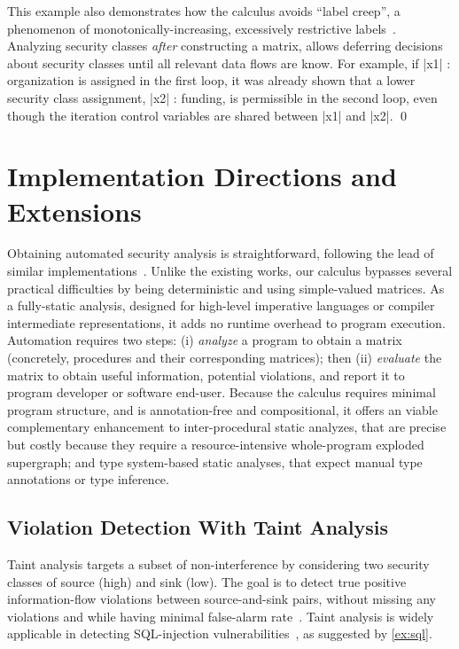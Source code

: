 \documentclass[conference]{IEEEtran}
\begin{document}
\begin{example}
This example also demonstrates how the calculus avoids \enquote{label creep}, a phenomenon of monotonically-increasing, excessively restrictive labels~\cite{sabelfeld2003}.
Analyzing security classes \emph{after} constructing a matrix, allows deferring decisions about security classes until all relevant data flows are know.
For example, if \prc|x1| : organization is assigned in the first loop, it was already shown that a lower security class assignment, \prc|x2| : funding, is permissible in the second loop, even though the iteration control variables are shared between \prc|x1| and \prc|x2|.
\qed
\end{example}


\section{Implementation Directions and Extensions}
\label{sec:implementation}

Obtaining automated security analysis is straightforward, following the lead of similar implementations~\cite{Aubert2022l,Moyen2017}.
Unlike the existing works, our calculus bypasses several practical difficulties by being deterministic and using simple-valued matrices.
As a fully-static analysis, designed for high-level imperative languages or compiler intermediate representations, it adds no runtime overhead to program execution.
Automation requires two steps:
(i) \emph{analyze} a program to obtain a matrix (concretely, procedures and their corresponding matrices); then
(ii) \emph{evaluate} the matrix to obtain useful information, \eg potential violations, and report it to program developer or software end-user.
Because the calculus requires minimal program structure, and is annotation-free and compositional, it offers an viable complementary enhancement to
\eg inter-procedural static analyzes, that are precise but costly because they require a resource-intensive whole-program exploded supergraph;
and type system-based static analyses, that expect manual type annotations or type inference.


\subsection{Violation Detection With Taint Analysis}

Taint analysis targets a subset of non-interference by considering two security classes of source (high) and sink (low).
The goal is to detect true positive information-flow violations between source-and-sink pairs, without missing any violations and while having minimal false-alarm rate~\cite{pauck2018}.
Taint analysis is widely applicable in \eg detecting SQL-injection vulnerabilities~\cite{huang2014}, as suggested by \autoref{ex:sql}.
\end{document}
